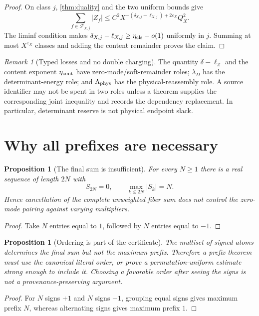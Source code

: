 \documentclass[11pt]{article}
\newtheorem{proposition}[theorem]{Proposition}
\theoremstyle{definition}
\theoremstyle{remark}
\newtheorem{remark}[theorem]{Remark}
\newcommand{\cF}{\mathcal F}
\begin{document}
\begin{proof}
On class \(j\), \cref{thm:duality} and the two uniform bounds give
\[
 \sum_{f\in\cF_{X,j}}
 |Z_f|
 \le
 C^2X^{-(\delta_{X,j}-\ell_{X,j})+2\varepsilon_X}Q_X^2.
\]
The liminf condition makes
\(\delta_{X,j}-\ell_{X,j}\ge\eta_{\rm cls}-o(1)\) uniformly in \(j\).
Summing at most \(X^{\varepsilon_X}\) classes and adding the content
remainder proves the claim.
\end{proof}

\begin{remark}[Typed losses and no double charging]
The quantity \(\delta-\ell_Z\) and the content exponent
\(\eta_{\rm cont}\) have zero-mode/soft-remainder roles;
\(\lambda_D\) has the determinant-energy role; and
\(\Lambda_{\rm phys}\) has the physical-reassembly role.  A source
identifier may not be spent in two roles unless a theorem supplies
the corresponding joint inequality and records the dependency
replacement.  In particular, determinant reserve is not physical
endpoint slack.
\end{remark}

\section{Why all prefixes are necessary}

\begin{proposition}[The final sum is insufficient]
\label{prop:final}
For every \(N\ge1\) there is a real sequence of length \(2N\) with
\[
 S_{2N}=0,\qquad \max_{k\le2N}|S_k|=N.
\]
Hence cancellation of the complete unweighted fiber sum does not
control the zero-mode pairing against varying multipliers.
\end{proposition}

\begin{proof}
Take \(N\) entries equal to \(1\), followed by \(N\) entries equal to
\(-1\).
\end{proof}

\begin{proposition}[Ordering is part of the certificate]
The multiset of signed atoms determines the final sum but not the
maximum prefix.  Therefore a prefix theorem must use the canonical
literal order, or prove a permutation-uniform estimate strong enough
to include it.  Choosing a favorable order after seeing the signs is
not a provenance-preserving argument.
\end{proposition}

\begin{proof}
For \(N\) signs \(+1\) and \(N\) signs \(-1\), grouping equal signs
gives maximum prefix \(N\), whereas alternating signs gives maximum
prefix \(1\).
\end{proof}
\end{document}
